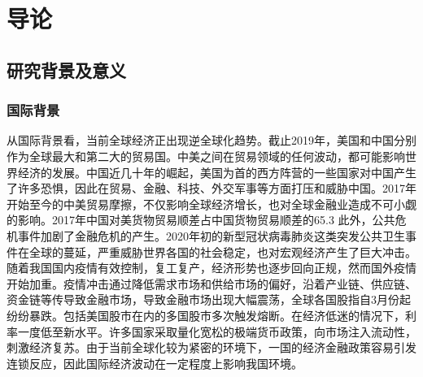 

\newpage
\section{导论}

\newpage
\subsection{研究背景及意义}




\subsubsection{国际背景}
从国际背景看，当前全球经济正出现逆全球化趋势。截止2019年，美国和中国分别作为全球最大和第二大的贸易国。中美之间在贸易领域的任何波动，都可能影响世界经济的发展。中国近几十年的崛起，美国为首的西方阵营的一些国家对中国产生了许多恐惧，因此在贸易、金融、科技、外交军事等方面打压和威胁中国。2017年开始至今的中美贸易摩擦，不仅影响全球经济增长，也对全球金融业造成不可小觑的影响。2017年中国对美货物贸易顺差占中国货物贸易顺差的65.3%
此外，公共危机事件加剧了金融危机的产生。2020年初的新型冠状病毒肺炎这类突发公共卫生事件在全球的蔓延，严重威胁世界各国的社会稳定，也对宏观经济产生了巨大冲击。随着我国国内疫情有效控制，复工复产，经济形势也逐步回向正规，然而国外疫情开始加重。疫情冲击通过降低需求市场和供给市场的偏好，沿着产业链、供应链、资金链等传导致金融市场，导致金融市场出现大幅震荡，全球各国股指自3月份起纷纷暴跌。包括美国股市在内的多国股市多次触发熔断。在经济低迷的情况下，利率一度低至新水平。许多国家采取量化宽松的极端货币政策，向市场注入流动性，刺激经济复苏。由于当前全球化较为紧密的环境下，一国的经济金融政策容易引发连锁反应，因此国际经济波动在一定程度上影响我国环境。

